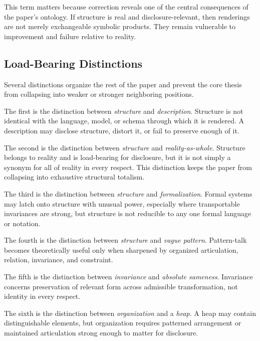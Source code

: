 \documentclass[11pt]{article}
\renewcommand{\emph}[1]{\textit{#1}}
\begin{document}
This term matters because correction reveals one of the central consequences of the paper's ontology. If structure is real and disclosure-relevant, then renderings are not merely exchangeable symbolic products. They remain vulnerable to improvement and failure relative to reality.

\subsection{Load-Bearing Distinctions}

Several distinctions organize the rest of the paper and prevent the core thesis from collapsing into weaker or stronger neighboring positions.

The first is the distinction between \emph{structure} and \emph{description}. Structure is not identical with the language, model, or schema through which it is rendered. A description may disclose structure, distort it, or fail to preserve enough of it. \cite{FriggNguyen2021ScientificRepresentationSEP}

The second is the distinction between \emph{structure} and \emph{reality-as-whole}. Structure belongs to reality and is load-bearing for disclosure, but it is not simply a synonym for all of reality in every respect. This distinction keeps the paper from collapsing into exhaustive structural totalism.

The third is the distinction between \emph{structure} and \emph{formalization}. Formal systems may latch onto structure with unusual power, especially where transportable invariances are strong, but structure is not reducible to any one formal language or notation. \cite{Cassirer1953SubstanceFunction,Shapiro2000ThinkingAboutMathematics}

The fourth is the distinction between \emph{structure} and \emph{vague pattern}. Pattern-talk becomes theoretically useful only when sharpened by organized articulation, relation, invariance, and constraint.

The fifth is the distinction between \emph{invariance} and \emph{absolute sameness}. Invariance concerns preservation of relevant form across admissible transformation, not identity in every respect. \cite{Nozick2001Invariances}

The sixth is the distinction between \emph{organization} and a \emph{heap}. A heap may contain distinguishable elements, but organization requires patterned arrangement or maintained articulation strong enough to matter for disclosure.
\end{document}
